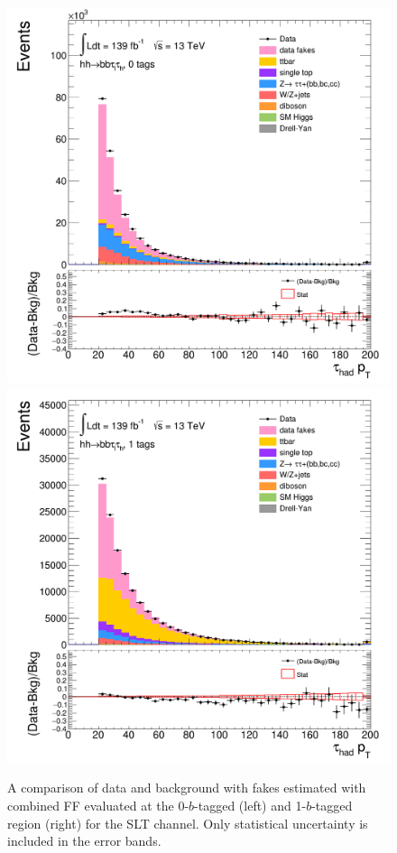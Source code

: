 \begin{figure}[htbp]
\centering
\includegraphics[width=.48\textwidth]{DiHiggs/plots/FF_CRs/SR_SLT_datafakes/HNone/BDTVarsHighMbb/0/C_0tag2pjet_0ptv_TauPt.png}
\includegraphics[width=.48\textwidth]{DiHiggs/plots/FF_CRs/SR_SLT_datafakes/HNone/BDTVarsHighMbb/1/C_1tag2pjet_0ptv_TauPt.png} \\
\caption{A comparison of data and background with fakes estimated with combined FF evaluated at the 0-$b$-tagged (left) 
and 1-$b$-tagged region (right) for the SLT channel.
Only statistical uncertainty is included in the error bands. }
\label{fig:FFVRSLT}
\end{figure}


